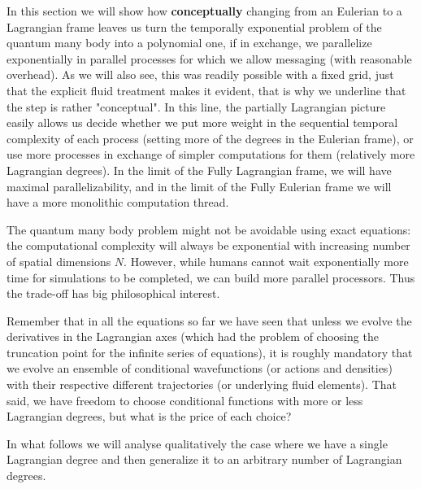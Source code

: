\documentclass[11pt, a4paper]{article} %
\begin{document}
In this section we will show how {\bf conceptually} changing from an Eulerian to a Lagrangian frame leaves us turn the temporally exponential problem of the quantum many body into a polynomial one, if in exchange, we parallelize exponentially in parallel processes for which we allow messaging (with reasonable overhead). As we will also see, this was readily possible with a fixed grid, just that the explicit fluid treatment makes it evident, that is why we underline that the step is rather "conceptual". In this line, the partially Lagrangian picture easily allows us decide whether we put more weight in the sequential temporal complexity of each process (setting more of the degrees in the Eulerian frame), or use more processes in exchange of simpler computations for them (relatively more Lagrangian degrees). In the limit of the Fully Lagrangian frame, we will have maximal parallelizability, and in the limit of the Fully Eulerian frame we will have a more monolithic computation thread.

The quantum many body problem might not be avoidable using exact equations: the computational complexity will always be exponential with increasing number of spatial dimensions $N$. However, while humans cannot wait exponentially more time for simulations to be completed, we can build more parallel processors. Thus the trade-off has big philosophical interest.

Remember that in all the equations so far we have seen that unless we evolve the derivatives in the Lagrangian axes (which had the problem of choosing the truncation point for the infinite series of equations), it is roughly mandatory that we evolve an ensemble of conditional wavefunctions (or actions and densities) with their respective different trajectories (or underlying fluid elements). That said, we have freedom to choose conditional functions with more or less Lagrangian degrees, but what is the price of each choice?

In what follows we will analyse qualitatively the case where we have a single Lagrangian degree and then generalize it to an arbitrary number of Lagrangian degrees.
\end{document}

